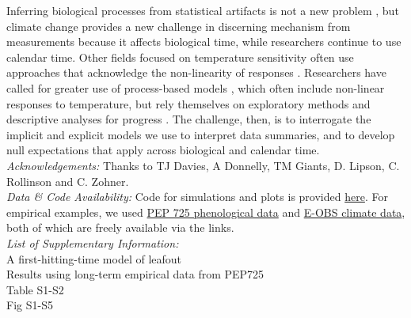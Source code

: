 \documentclass[11pt,letter]{article}
\begin{document}
Inferring biological processes from statistical artifacts is not a new problem \citep[e.g.,][]{nee2005}, but climate change provides a new challenge in discerning mechanism from measurements because it affects biological time, while researchers continue to use calendar time. Other fields focused on temperature sensitivity often use approaches that acknowledge the non-linearity of responses \citep[e.g.,][]{yuste2004}. Researchers have called for greater use of process-based models \citep{keenan2019}, which often include non-linear responses to temperature, but rely themselves on exploratory methods and descriptive analyses for progress \citep{chuine2016}. The challenge, then, is to interrogate the implicit and explicit models we use to interpret data summaries, and to develop null expectations that apply across biological and calendar time. \\



\vspace{5ex}
\emph{Acknowledgements:} Thanks to TJ Davies, A Donnelly, TM Giants, D. Lipson, C. Rollinson and C. Zohner. \\

\emph{Data \& Code Availability:} Code for simulations and plots is provided \href{https://github.com/temporalecologylab/labgit/tree/master/projects/decsenspost}{here}. For empirical examples, we used \href{http://www.pep725.eu/data.php}{PEP 725 phenological data} and \href{https://surfobs.climate.copernicus.eu/dataaccess/access_eobs.php}{E-OBS climate data}, both of which are freely available via the links.\\

\emph{List of Supplementary Information:}\\
A first-hitting-time model of leafout\\
Results using long-term empirical data from PEP725\\
Table S1-S2\\
Fig S1-S5\\
\end{document}
